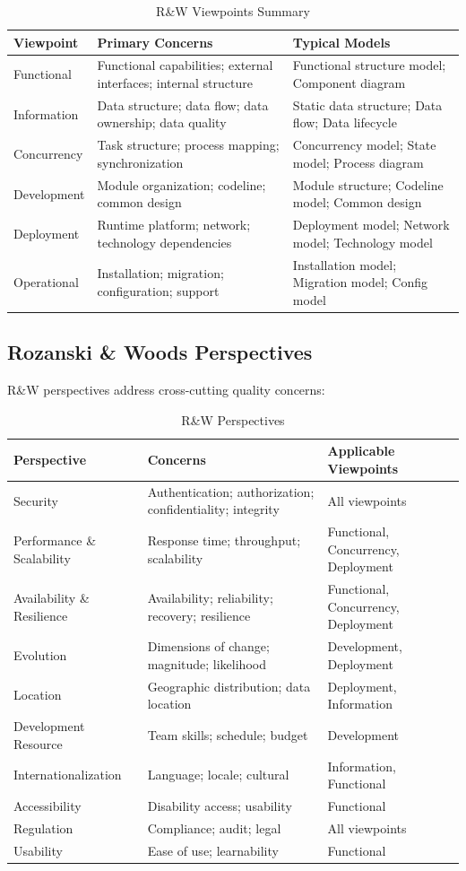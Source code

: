 \documentclass[11pt]{article}
\begin{document}
\begin{longtable}{@{}L{2.5cm} L{4cm} L{6cm}@{}}
\caption{R\&W Viewpoints Summary} \\
\toprule
\textbf{Viewpoint} & \textbf{Primary Concerns} & \textbf{Typical Models} \\
\midrule
\endfirsthead
\bottomrule
\endlastfoot
Functional & Functional capabilities; external interfaces; internal structure & Functional structure model; Component diagram \\
Information & Data structure; data flow; data ownership; data quality & Static data structure; Data flow; Data lifecycle \\
Concurrency & Task structure; process mapping; synchronization & Concurrency model; State model; Process diagram \\
Development & Module organization; codeline; common design & Module structure; Codeline model; Common design \\
Deployment & Runtime platform; network; technology dependencies & Deployment model; Network model; Technology model \\
Operational & Installation; migration; configuration; support & Installation model; Migration model; Config model \\
\end{longtable}

\subsection{Rozanski \& Woods Perspectives}

R\&W perspectives address cross-cutting quality concerns:

\begin{longtable}{@{}L{3.4cm} L{4.3cm} L{4.8cm}@{}}
\caption{R\&W Perspectives} \\
\toprule
\textbf{Perspective} & \textbf{Concerns} & \textbf{Applicable Viewpoints} \\
\midrule
\endfirsthead
\bottomrule
\endlastfoot
Security & Authentication; authorization; confidentiality; integrity & All viewpoints \\
Performance \& Scalability & Response time; throughput; scalability & Functional, Concurrency, Deployment \\
Availability \& Resilience & Availability; reliability; recovery; resilience & Functional, Concurrency, Deployment \\
Evolution & Dimensions of change; magnitude; likelihood & Development, Deployment \\
Location & Geographic distribution; data location & Deployment, Information \\
Development Resource & Team skills; schedule; budget & Development \\
Internationalization & Language; locale; cultural & Information, Functional \\
Accessibility & Disability access; usability & Functional \\
Regulation & Compliance; audit; legal & All viewpoints \\
Usability & Ease of use; learnability & Functional \\
\end{longtable}
\end{document}

